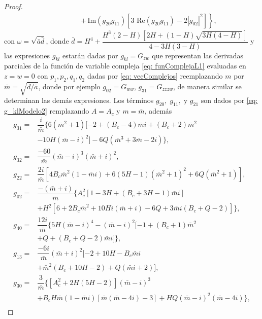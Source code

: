 \documentclass[]{article}
\theoremstyle{remark}
\begin{document}
\begin{proof}
\begin{equation}
\begin{aligned}
				& \qquad\qquad \left. + \, \text{Im}(g_{20} g_{11}) \left[ 3 \text{ Re}(g_{20} g_{11}) - 2 |g_{02}|^2 \right] \right\},
			\end{aligned}
			\label{eq: l2}
		\end{equation}
		con $\omega = \sqrt{\bar{a}\bar{d}}$, donde $\bar{d} = H^4+\dfrac{H^3(2-H) [2H+(1-H) \sqrt{3H(4-H)}]}{4-3H(3-H)}$ y las expresiones $g_{kl}$ estarán dadas por $g_{kl}=G_{z w}$ que representan las derivadas parciales de la función de variable compleja \eqref{eq: funComplejaL1} evaluadas en $z=w=0$ con $p_1, p_2, q_1, q_2$ dadas por \eqref{eq: vecComplejos} reemplazando $m$ por $\bar{m} = \sqrt{\bar{d}/\bar{a}}$, donde por ejemplo $g_{02}=G_{ww}$, $g_{31}=G_{zzzw}$, de manera similar se determinan las demás expresiones. Los términos $g_{20}, \; g_{11}, \; \text{y } g_{21}$ son dados por \eqref{eq: g_klModelo2} remplazando $A=A_c$ y $m = \bar{m}$, además
		\begin{equation*}
			\begin{aligned}
				g_{31} = & \dfrac{i}{\bar{m}} \{6(\bar{m}^2+1)[-2 + (B_c-4)\bar{m}i + (B_c+2)\bar{m}^2 \\
				& - 10H(\bar{m}-i)^2] - 6Q(\bar{m}^3 + 3\bar{m} -2i)\}, \\
				g_{32} = & \dfrac{-60}{\bar{m}}(\bar{m}-i)^3 (\bar{m}+i)^2, \\
				g_{22} = & \dfrac{2i}{\bar{m}} [4B_c\bar{m}^2(1 - \bar{m}i) + 6(5H-1)(\bar{m}^2+1)^2 + 6Q(\bar{m}^2+1)], \\
				g_{02} = & \dfrac{-(\bar{m}+i)}{\bar{m}}\{ A_c^2[1 - 3H + (B_c + 3H - 1)\bar{m}i] \\
				& + H^2[6 + 2B_c\bar{m}^2 + 10Hi(\bar{m}+i) - 6Q + 3\bar{m}i(B_c + Q - 2)] \}, \\
				g_{40} = & \dfrac{12i}{\bar{m}} \{ 5H(\bar{m}-i)^4 - (\bar{m}-i)^2[-1 + (B_c+1)\bar{m}^2 \\
				& + Q + (B_c + Q - 2)\bar{m}i] \}, \\
				g_{13} = & \dfrac{-6i}{\bar{m}} (\bar{m}+i)^2[-2 + 10H - B_c\bar{m}i \\
				& + \bar{m}^2(B_c + 10H-2) + Q(\bar{m}i+2)], \\
				g_{30} = & \dfrac{3}{\bar{m}} \{ [A_c^2 + 2H(5H-2)](\bar{m}-i)^3 \\
				& + B_cH\bar{m}(1 - \bar{m}i)[\bar{m}(\bar{m}-4i)-3] + HQ(\bar{m}-i)^2(\bar{m}-4i) \},
			\end{aligned}
		\end{equation*}
		\begin{equation*}
			\begin{aligned}

\end{aligned}
\end{equation*}
\end{proof}
\end{document}
